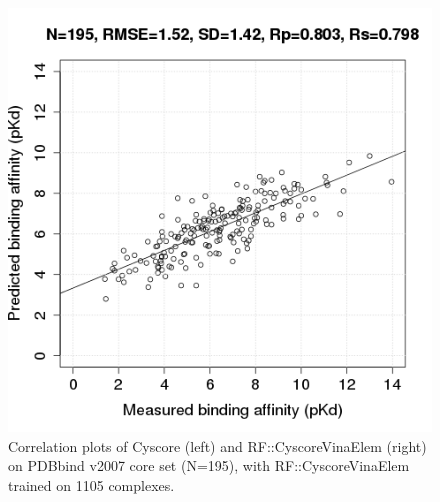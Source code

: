 \documentclass[journal=jacsat,manuscript=article]{achemso}
\begin{document}
\begin{figure}
\includegraphics[width=1.4\linewidth,natwidth=480,natheight=480]{../rfcyscore/x46/rf/trn-1105-tst-195-yp.png}
\endminipage\hfill
\caption{Correlation plots of Cyscore (left) and RF::CyscoreVinaElem (right) on PDBbind v2007 core set (N=195), with RF::CyscoreVinaElem trained on 1105 complexes.}
\label{fig:tst195}
\end{figure}
\end{document}

